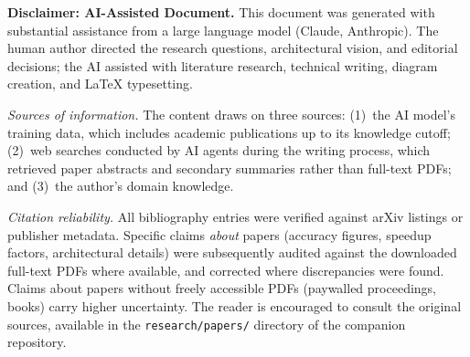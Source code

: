 \documentclass[11pt,a4paper]{article}
\theoremstyle{definition}
\theoremstyle{remark}
\theoremstyle{plain}
\begin{document}
\clearpage

\begin{small}
\noindent\textbf{Disclaimer: AI-Assisted Document.}\quad
This document was generated with substantial assistance from a large
language model (Claude, Anthropic). The human author directed the
research questions, architectural vision, and editorial decisions;
the AI assisted with literature research, technical writing, diagram
creation, and \LaTeX{} typesetting.

\smallskip\noindent\textit{Sources of information.}\quad
The content draws on three sources: (1)~the AI model's training data,
which includes academic publications up to its knowledge cutoff;
(2)~web searches conducted by AI agents during the writing process,
which retrieved paper abstracts and secondary summaries rather than
full-text PDFs; and (3)~the author's domain knowledge.

\smallskip\noindent\textit{Citation reliability.}\quad
All bibliography entries were verified against arXiv listings or
publisher metadata. Specific claims \emph{about} papers (accuracy
figures, speedup factors, architectural details) were subsequently
audited against the downloaded full-text PDFs where available, and
corrected where discrepancies were found. Claims about papers
without freely accessible PDFs (paywalled proceedings, books) carry
higher uncertainty. The reader is encouraged to consult the original
sources, available in the \texttt{research/papers/} directory of the
companion repository.
\end{small}

\clearpage

\tableofcontents
\clearpage















\appendix




\clearpage
\printbibliography[heading=bibintoc]
\end{document}
